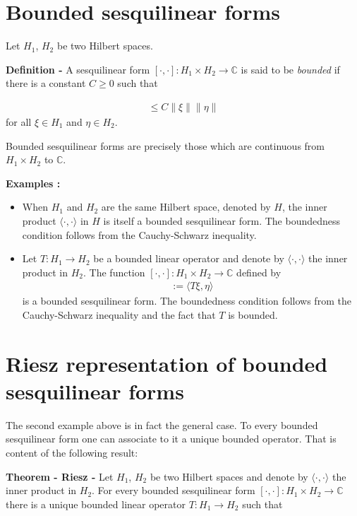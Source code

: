 \documentclass[12pt]{article}
\begin{document}

\section*{Bounded sesquilinear forms}

Let $H_1$, $H_2$ be two Hilbert spaces.

{\bf Definition -} A sesquilinear form $[\cdot, \cdot ] : H_1 \times H_2 \to \mathbb{C}$ is said to be \emph{bounded} if there is a constant $C \geq 0$ such that

\begin{align*}
[\xi, \eta ] \leq C \| \xi \| \| \eta \|
\end{align*}
for all $\xi \in H_1$ and $\eta \in H_2$.

Bounded sesquilinear forms are precisely those which are continuous from $H_1 \times H_2$ to $\mathbb{C}$.

{\bf Examples :}

\begin{itemize}
\item When $H_1$ and $H_2$ are the same Hilbert space, denoted by $H$, the inner product $\langle \cdot, \cdot \rangle$ in $H$ is itself a bounded sesquilinear form. The boundedness condition follows from the Cauchy-Schwarz inequality.
\item Let $T: H_1 \to H_2$ be a bounded linear operator and denote by $\langle \cdot, \cdot \rangle$ the inner product in $H_2$. The function $[\cdot, \cdot ] : H_1 \times H_2 \to \mathbb{C}$ defined by
\begin{align*}
[\xi, \eta ] := \langle T \xi, \eta \rangle
\end{align*}
is a bounded sesquilinear form. The boundedness condition follows from the Cauchy-Schwarz inequality and the fact that $T$ is bounded.
\end{itemize}

\section*{Riesz representation of bounded sesquilinear forms}

The second example above is in fact the general case. To every bounded sesquilinear form one can associate to it a unique bounded operator. That is content of the following result:

{\bf Theorem - Riesz  -} Let $H_1$, $H_2$ be two Hilbert spaces and denote by $\langle \cdot, \cdot \rangle$ the inner product in $H_2$. For every bounded sesquilinear form $[\cdot, \cdot]: H_1 \times H_2 \to \mathbb{C}$ there is a unique bounded linear operator $T: H_1 \to H_2$ such that
\end{document}
